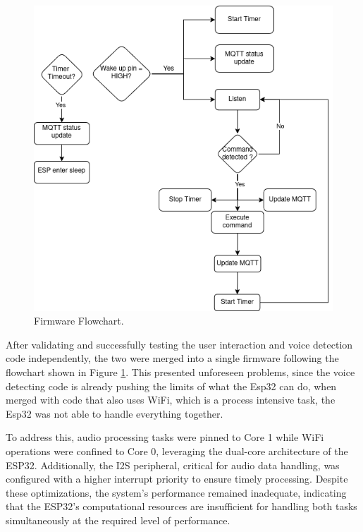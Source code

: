 \begin{figure}[H]
    \centering
    \includegraphics*[scale = 0.5]{Images/FirmawareFlowChart.png}
    \caption{Firmware Flowchart.}
    \label{fig:firmwareFlowchart}
\end{figure}

After validating and successfully testing the user interaction and voice detection code independently, the two were merged into a single firmware following the flowchart shown in Figure \ref{fig:firmwareFlowchart}. This presented unforeseen problems, since the voice detecting code is already pushing the limits of what the Esp32 can do, when merged with code that also uses WiFi, which is a process intensive task, the Esp32 was not able to handle everything together.

To address this, audio processing tasks were pinned to Core 1 while WiFi operations were confined to Core 0, leveraging the dual-core architecture of the ESP32. Additionally, the I2S peripheral, critical for audio data handling, was configured with a higher interrupt priority to ensure timely processing. Despite these optimizations, the system's performance remained inadequate, indicating that the ESP32's computational resources are insufficient for handling both tasks simultaneously at the required level of performance.

